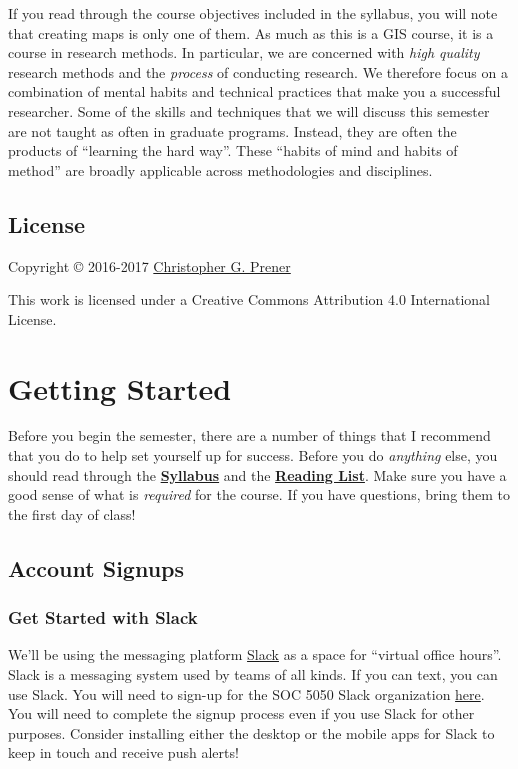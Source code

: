 \documentclass[]{book}
\theoremstyle{definition}
\theoremstyle{definition}
\theoremstyle{remark}
\begin{document}
If you read through the course objectives included in the syllabus, you
will note that creating maps is only one of them. As much as this is a
GIS course, it is a course in research methods. In particular, we are
concerned with \emph{high quality} research methods and the
\emph{process} of conducting research. We therefore focus on a
combination of mental habits and technical practices that make you a
successful researcher. Some of the skills and techniques that we will
discuss this semester are not taught as often in graduate programs.
Instead, they are often the products of ``learning the hard way''. These
``habits of mind and habits of method'' are broadly applicable across
methodologies and disciplines.

\section*{License}\label{license}

Copyright © 2016-2017 \href{http://chrisprener.net}{Christopher G.
Prener}

This work is licensed under a Creative Commons Attribution 4.0
International License.

\chapter{Getting Started}\label{gettingStarted}

Before you begin the semester, there are a number of things that I
recommend that you do to help set yourself up for success. Before you do
\emph{anything} else, you should read through the
\href{}{\textbf{Syllabus}} and the \href{}{\textbf{Reading List}}. Make
sure you have a good sense of what is \emph{required} for the course. If
you have questions, bring them to the first day of class!

\section{Account Signups}\label{account-signups}

\subsection{Get Started with Slack}\label{get-started-with-slack}

We'll be using the messaging platform \href{https://slack.com}{Slack} as
a space for ``virtual office hours''. Slack is a messaging system used
by teams of all kinds. If you can text, you can use Slack. You will need
to sign-up for the SOC 5050 Slack organization
\href{https://join.slack.com/t/slu-soc5050/signup}{here}. You will need
to complete the signup process even if you use Slack for other purposes.
Consider installing either the desktop or the mobile apps for Slack to
keep in touch and receive push alerts!
\end{document}
